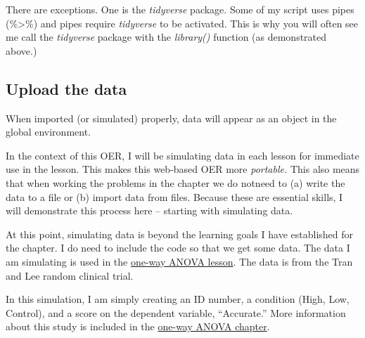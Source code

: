 \documentclass[
  11pt,
]{book}
\begin{document}
There are exceptions. One is the \emph{tidyverse} package. Some of my script uses pipes (\%\textgreater\%) and pipes require \emph{tidyverse} to be activated. This is why you will often see me call the \emph{tidyverse} package with the \emph{library()} function (as demonstrated above.)

\hypertarget{upload-the-data}{%
\subsection{Upload the data}\label{upload-the-data}}

When imported (or simulated) properly, data will appear as an object in the global environment.

In the context of this OER, I will be simulating data in each lesson for immediate use in the lesson. This makes this web-based OER more \emph{portable.} This also means that when working the problems in the chapter we do notneed to (a) write the data to a file or (b) import data from files. Because these are essential skills, I will demonstrate this process here -- starting with simulating data.

At this point, simulating data is beyond the learning goals I have established for the chapter. I do need to include the code so that we get some data. The data I am simulating is used in the \protect\hyperlink{oneway}{one-way ANOVA lesson}. The data is from the Tran and Lee \citeyearpar{tran_you_2014} random clinical trial.

In this simulation, I am simply creating an ID number, a condition (High, Low, Control), and a score on the dependent variable, ``Accurate.'' More information about this study is included in the \protect\hyperlink{oneway}{one-way ANOVA chapter}.
\end{document}
